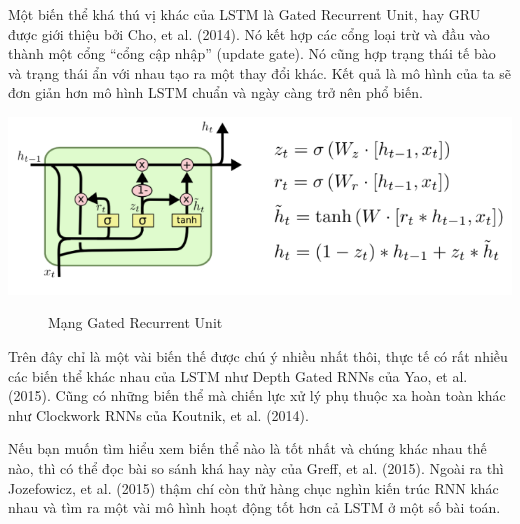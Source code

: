 Một biến thể khá thú vị khác của LSTM là Gated Recurrent Unit, hay GRU được giới thiệu bởi Cho, et al. (2014). Nó kết hợp các cổng loại trừ và đầu vào thành một cổng “cổng cập nhập” (update gate). Nó cũng hợp trạng thái tế bào và trạng thái ẩn với nhau tạo ra một thay đổi khác. Kết quả là mô hình của ta sẽ đơn giản hơn mô hình LSTM chuẩn và ngày càng trở nên phổ biến.
\begin{center}
    \includegraphics[scale=.5]{image/chapter6/bth3.png}
    \begin{figure}[htp]
    \begin{center}
     
    \end{center}
    \caption{Mạng Gated Recurrent Unit}
    \end{figure}
\end{center}
Trên đây chỉ là một vài biến thế được chú ý nhiều nhất thôi, thực tế có rất nhiều các biến thể khác nhau của LSTM như Depth Gated RNNs của Yao, et al. (2015). Cũng có những biến thể mà chiến lực xử lý phụ thuộc xa hoàn toàn khác như Clockwork RNNs của Koutnik, et al. (2014).\par
Nếu bạn muốn tìm hiểu xem biến thể nào là tốt nhất và chúng khác nhau thế nào, thì có thể đọc bài so sánh khá hay này của Greff, et al. (2015). Ngoài ra thì Jozefowicz, et al. (2015) thậm chí còn thử hàng chục nghìn kiến trúc RNN khác nhau và tìm ra một vài mô hình hoạt động tốt hơn cả LSTM ở một số bài toán.


